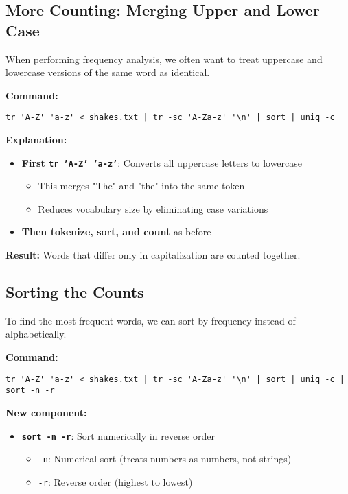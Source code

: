 \documentclass[11pt,a4paper]{article}
\theoremstyle{definition}
\theoremstyle{plain}
\theoremstyle{remark}
\begin{document}
\subsection{More Counting: Merging Upper and Lower Case}

When performing frequency analysis, we often want to treat uppercase and lowercase versions of the same word as identical.

\textbf{Command:}
\begin{verbatim}
tr 'A-Z' 'a-z' < shakes.txt | tr -sc 'A-Za-z' '\n' | sort | uniq -c
\end{verbatim}

\textbf{Explanation:}
\begin{itemize}
    \item \textbf{First \texttt{tr 'A-Z' 'a-z'}}: Converts all uppercase letters to lowercase
    \begin{itemize}
        \item This merges "The" and "the" into the same token
        \item Reduces vocabulary size by eliminating case variations
    \end{itemize}
    \item \textbf{Then tokenize, sort, and count} as before
\end{itemize}

\textbf{Result:} Words that differ only in capitalization are counted together.

\subsection{Sorting the Counts}

To find the most frequent words, we can sort by frequency instead of alphabetically.

\textbf{Command:}
\begin{verbatim}
tr 'A-Z' 'a-z' < shakes.txt | tr -sc 'A-Za-z' '\n' | sort | uniq -c | sort -n -r
\end{verbatim}

\textbf{New component:}
\begin{itemize}
    \item \textbf{\texttt{sort -n -r}}: Sort numerically in reverse order
    \begin{itemize}
        \item \texttt{-n}: Numerical sort (treats numbers as numbers, not strings)
        \item \texttt{-r}: Reverse order (highest to lowest)
    \end{itemize}
\end{itemize}
\end{document}
